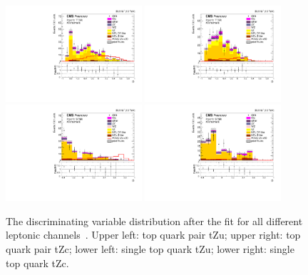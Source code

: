 \documentclass{PoS}
\begin{document}
\begin{figure}[htb]
\centering
\includegraphics[width=0.45\textwidth]{figures/CMS-PAS-TOP-17-017_Figure_003-a}
\includegraphics[width=0.45\textwidth]{figures/CMS-PAS-TOP-17-017_Figure_003-b}\\
\includegraphics[width=0.45\textwidth]{figures/CMS-PAS-TOP-17-017_Figure_003-c}
\includegraphics[width=0.45\textwidth]{figures/CMS-PAS-TOP-17-017_Figure_003-d}
\caption{
  The discriminating variable distribution after the fit for all different
  leptonic channels~\cite{top-17-017}. Upper left: top quark pair tZu; upper
  right: top quark pair tZc; lower left: single top quark tZu; lower right:
  single top quark tZc.
}
\label{fig:TOP-17-017_Figure_003}
\end{figure}
\end{document}
